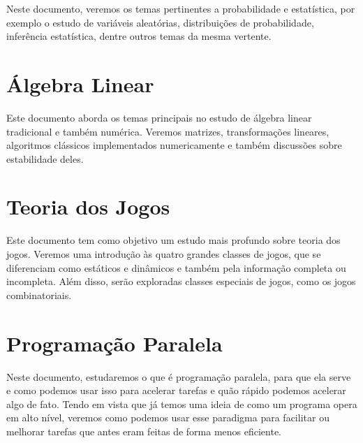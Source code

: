 \documentclass[11pt, a4paper]{article}
\begin{document}
Neste documento, veremos os temas pertinentes a probabilidade e estatística, por exemplo o estudo de variáveis aleatórias, distribuições de probabilidade, inferência estatística, dentre outros temas da mesma vertente.

\section{Álgebra Linear}

Este documento aborda os temas principais no estudo de álgebra linear tradicional e também numérica. Veremos matrizes, transformações lineares, algoritmos clássicos implementados numericamente e também discussões sobre estabilidade deles.

\section{Teoria dos Jogos}

Este documento tem como objetivo um estudo mais profundo sobre teoria dos jogos. Veremos uma introdução às quatro grandes classes de jogos, que se diferenciam como estáticos e dinâmicos e também pela informação completa ou incompleta. Além disso, serão exploradas classes especiais de jogos, como os jogos combinatoriais.

\section{Programação Paralela}

Neste documento, estudaremos o que é programação paralela, para que ela serve e como podemos usar isso para acelerar tarefas e quão rápido podemos acelerar algo de fato. Tendo em vista que já temos uma ideia de como um programa opera em alto nível, veremos como podemos usar esse paradigma para facilitar ou melhorar tarefas que antes eram feitas de forma menos eficiente.
\end{document}
